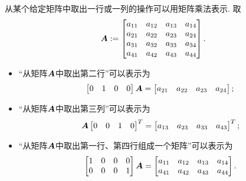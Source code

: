 \begin{example}
从某个给定矩阵中取出一行或一列的操作可以用矩阵乘法表示.
取\begin{equation*}
	\boldsymbol{A}
	:=
	\begin{bmatrix}
		a_{11} & a_{12} & a_{13} & a_{14} \\
		a_{21} & a_{22} & a_{23} & a_{24} \\
		a_{31} & a_{32} & a_{33} & a_{34} \\
		a_{41} & a_{42} & a_{43} & a_{44} \\
	\end{bmatrix}.
\end{equation*}
\begin{itemize}
	\item “从矩阵\(\boldsymbol{A}\)中取出第二行”可以表示为\begin{equation*}
		\begin{bmatrix}
			0 & 1 & 0 & 0 \\
		\end{bmatrix}
		\boldsymbol{A}
		= \begin{bmatrix}
			a_{21} & a_{22} & a_{23} & a_{24} \\
		\end{bmatrix};
	\end{equation*}

	\item “从矩阵\(\boldsymbol{A}\)中取出第三列”可以表示为\begin{equation*}
		\boldsymbol{A}
		\begin{bmatrix}
			0 & 0 & 1 & 0
		\end{bmatrix}^T
		= \begin{bmatrix}
			a_{13} & a_{23} & a_{33} & a_{43}
		\end{bmatrix}^T;
	\end{equation*}

	\item “从矩阵\(\boldsymbol{A}\)中取出第一行、第四行组成一个矩阵”可以表示为\begin{equation*}
		\begin{bmatrix}
			1 & 0 & 0 & 0 \\
			0 & 0 & 0 & 1 \\
		\end{bmatrix}
		\boldsymbol{A}
		= \begin{bmatrix}
			a_{11} & a_{12} & a_{13} & a_{14} \\
			a_{41} & a_{42} & a_{43} & a_{44} \\
		\end{bmatrix}.
	\end{equation*}
\end{itemize}
\end{example}

